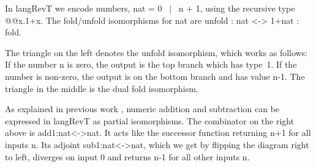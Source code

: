 \documentclass{llncs}
\begin{document}
In {{langRevT}} we encode numbers, {{nat = 0 ~|~ n + 1}}, using the
recursive type {{@@x.1+x}}. The {{fold}}/{{unfold}} isomorphisms for
{{nat}} are {{unfold : nat <-> 1+nat : fold}}.
\begin{multicols}{3}
\begin{center}
\end{center}

\begin{center}
\end{center}

\begin{center}
\end{center}
\end{multicols}
The triangle on the left denotes the {{unfold}} isomorphism, which
works as follows: If the number {{n}} is zero, the output is the top
branch which has type~{{1}}. If the number is non-zero, the output is
on the bottom branch and has value {{n-1}}. The triangle in the middle
is the dual {{fold}} isomorphism.  

As explained in previous work
\cite[Sec.~4.2]{James:2012:IE:2103656.2103667}, numeric addition and
subtraction can be expressed in {{langRevT}} as partial
isomorphisms. The combinator on the right above is
{{add1:nat<->nat}}. It acts like the successor function returning
{{n+1}} for all inputs {{n}}. Its adjoint {{sub1:nat<->nat}}, which we
get by flipping the diagram right to left, diverges on input {{0}} and
returns {{n-1}} for all other inputs {{n}}.

\end{document}
